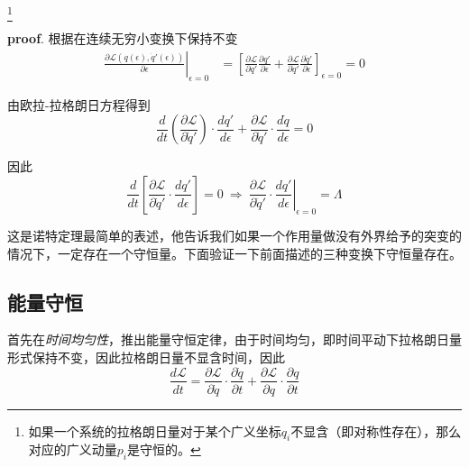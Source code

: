 \footnote{如果一个系统的拉格朗日量对于某个广义坐标$q_i$不显含（即对称性存在），那么对应的广义动量$p_i$是守恒的。}
\begin{mdframed}[backgroundcolor=gray!20,hidealllines=true]
    \textbf{proof}. 根据在连续无穷小变换下保持不变
    \begin{equation}
        \begin{aligned}
            \left.\frac{\partial \mathcal{L}(q(\epsilon),\dot{q}'(\epsilon))}{\partial \epsilon}\right|_{\epsilon=0}&=\left[\frac{\partial\mathcal{L}}{\partial q'}\frac{\partial q'}{\partial \epsilon}+\frac{\partial\mathcal{L}}{\partial \dot{q}'}\frac{\partial \dot{q}'}{\partial \epsilon}\right]_{\epsilon=0}=0
        \end{aligned}
     \end{equation}

     由欧拉-拉格朗日方程得到
     \begin{equation}
        \frac{d}{dt}(\frac{\partial\mathcal{L}}{\partial \dot{q}'})\cdot\frac{d q'}{d\epsilon}+\frac{\partial \mathcal{L}}{\partial \dot{q}'}\cdot \frac{d \dot{q}}{d\epsilon}=0
     \end{equation}

     因此
     \begin{equation}
        \frac{d}{dt}\left[\frac{\partial\mathcal{L}}{\partial \dot{q}'}\cdot \frac{dq'}{d\epsilon}\right]=0\ \Rightarrow\ \left.\frac{\partial\mathcal{L}}{\partial \dot{q}'}\cdot \frac{dq'}{d\epsilon}\right|_{\epsilon=0}=\varLambda
     \end{equation}

\end{mdframed}


这是诺特定理最简单的表述，他告诉我们如果一个作用量做没有外界给予的突变的情况下，一定存在一个守恒量。下面验证一下前面描述的三种变换下守恒量存在。

\subsection*{能量守恒}

首先在\textsl{时间均匀性}，推出能量守恒定律，由于时间均匀，即时间平动下拉格朗日量形式保持不变，因此拉格朗日量不显含时间，因此
\begin{equation}
    \frac{d \mathcal{L}}{dt}=\frac{\partial \mathcal{L}}{\partial \dot{q}}\cdot \frac{\partial \dot{q}}{\partial t}+\frac{\partial \mathcal{L}}{\partial q}\cdot \frac{\partial q}{\partial t}
\end{equation}


